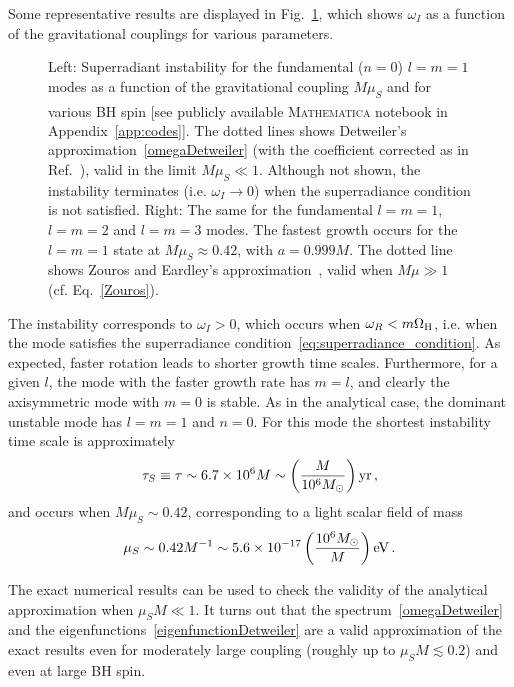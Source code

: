 \documentclass[11pt]{article}
\numberwithin{equation}{section} %
\begin{document}
Some representative results are displayed in Fig.~\ref{fig:instabilityscalar}, which shows $\omega_I$ as a function of the gravitational couplings for various parameters.
%
\begin{figure}
 \caption{
 Left: Superradiant instability for the fundamental ($n=0$) $l=m=1$ modes as a function of the gravitational coupling $M\mu_S$ and for various BH spin [see publicly available {\scshape Mathematica}\textsuperscript{\textregistered} notebook in Appendix~\ref{app:codes}]. The dotted lines shows Detweiler's approximation~\eqref{omegaDetweiler} \cite{Detweiler:1980uk} (with the coefficient corrected as in Ref.~\cite{Pani:2012bp}), valid in the limit $M\mu_S \ll 1$. Although not shown, the instability terminates (i.e. $\omega_I\to0$) when the superradiance condition is not satisfied.
%
Right: The same for the fundamental $l=m=1$, $l=m=2$ and $l=m=3$ modes. The fastest growth occurs for the $l=m=1$ state at $M \mu_S \approx 0.42$, with $a = 0.999 M$. The dotted line shows Zouros and Eardley's approximation~\cite{Zouros:1979iw}, valid when $M\mu \gg 1$ (cf. Eq.~\eqref{Zouros}).}
\label{fig:instabilityscalar}
\end{figure}
%
The instability corresponds to $\omega_I>0$, which occurs when $\omega_R<m\Omega_{\rm H}$, i.e. when the mode satisfies the superradiance condition~\eqref{eq:superradiance_condition}. As expected, faster rotation leads to shorter growth time scales. Furthermore, for a given $l$, the mode with the faster growth rate has $m=l$, and clearly the axisymmetric mode with $m=0$ is stable. As in the analytical case, the dominant unstable mode has $l=m=1$ and $n=0$. For this mode the shortest instability time scale is approximately
\begin{equation}
 \tau_S\equiv\tau\sim 6.7\times 10^6 M\sim \left(\frac{M}{10^6M_\odot}\right){\rm yr}\,,\label{tauscalar}
\end{equation}
and occurs when $M\mu_S\sim 0.42$, corresponding to a light scalar field of mass
\begin{equation}
 \mu_S\sim 0.42 M^{-1}\sim 5.6\times 10^{-17} \left(\frac{10^6 M_\odot}{M}\right){\rm eV}\,.
\end{equation}
%


The exact numerical results can be used to check the validity of the analytical approximation when $\mu_S M\ll1$. It turns out that the spectrum~\eqref{omegaDetweiler} and the eigenfunctions~\eqref{eigenfunctionDetweiler} are a valid approximation of the exact results even for moderately large coupling (roughly up to $\mu_S M\lesssim0.2$) and even at large BH spin.
\end{document}
